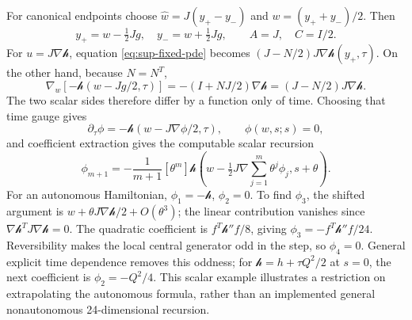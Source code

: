 For canonical endpoints choose $\widehat w=J(y_+-y_-)$ and $w=(y_++y_-)/2$. Then
\begin{equation}
 y_+=w-\tfrac12Jg,\quad y_-=w+\tfrac12Jg,
 \qquad A=J,\quad C=I/2.
 \label{eq:sup-central-inverse}
\end{equation}
For $u=J\nabla\mathcal h$, equation \eqref{eq:sup-fixed-pde} becomes $(J-N/2)J\nabla\mathcal h(y_+,\tau)$. On the other hand, because $N=N^T$,
\begin{equation}
 \nabla_w[-\mathcal h(w-Jg/2,\tau)]
 =-(I+NJ/2)\nabla\mathcal h
 =(J-N/2)J\nabla\mathcal h.
 \label{eq:sup-central-gradient}
\end{equation}
The two scalar sides therefore differ by a function only of time. Choosing that time gauge gives
\begin{equation}
 \partial_\tau\phi=-\mathcal h(w-J\nabla\phi/2,\tau),\qquad\phi(w,s;s)=0,
 \label{eq:sup-hamilton-jacobi}
\end{equation}
and coefficient extraction gives the computable scalar recursion
\begin{equation}
 \phi_{m+1}=-\frac1{m+1}[\theta^m]\mathcal h\left(
 w-\tfrac12J\nabla\sum_{j=1}^m\theta^j\phi_j,s+\theta\right).
 \label{eq:sup-scalar-recursion}
\end{equation}
For an autonomous Hamiltonian, $\phi_1=-\mathcal h$, $\phi_2=0$. To find $\phi_3$, the shifted argument is $w+\theta J\nabla\mathcal h/2+O(\theta^3)$; the linear contribution vanishes since $\nabla\mathcal h^TJ\nabla\mathcal h=0$. The quadratic coefficient is $f^T\mathcal h''f/8$, giving $\phi_3=-f^T\mathcal h''f/24$. Reversibility makes the local central generator odd in the step, so $\phi_4=0$. General explicit time dependence removes this oddness; for $\mathcal h=h+\tau Q^2/2$ at $s=0$, the next coefficient is $\phi_2=-Q^2/4$. This scalar example illustrates a restriction on extrapolating the autonomous formula, rather than an implemented general nonautonomous 24-dimensional recursion.

